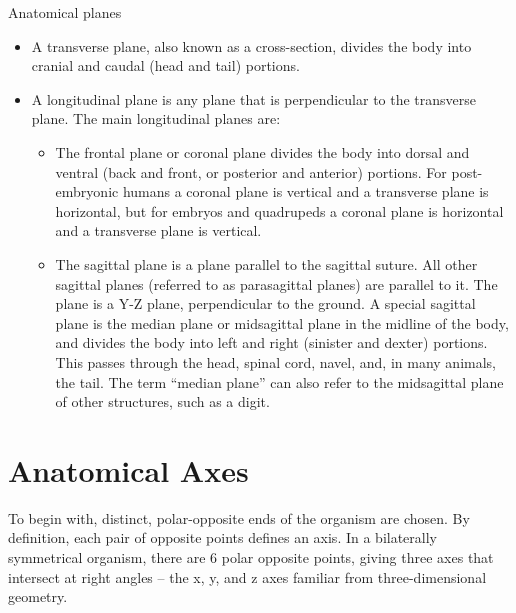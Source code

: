Anatomical planes

\begin{itemize}
\tightlist
\item
  A transverse plane, also known as a cross-section, divides the body into cranial and caudal (head and tail) portions.
\item
  A longitudinal plane is any plane that is perpendicular to the transverse plane. The main longitudinal planes are:

  \begin{itemize}
  \tightlist
  \item
    The frontal plane or coronal plane divides the body into dorsal and ventral (back and front, or posterior and anterior) portions. For post-embryonic humans a coronal plane is vertical and a transverse plane is horizontal, but for embryos and quadrupeds a coronal plane is horizontal and a transverse plane is vertical.
  \item
    The sagittal plane is a plane parallel to the sagittal suture. All other sagittal planes (referred to as parasagittal planes) are parallel to it. The plane is a Y-Z plane, perpendicular to the ground. A special sagittal plane is the median plane or midsagittal plane in the midline of the body, and divides the body into left and right (sinister and dexter) portions. This passes through the head, spinal cord, navel, and, in many animals, the tail. The term ``median plane'' can also refer to the midsagittal plane of other structures, such as a digit.
  \end{itemize}
\end{itemize}

\hypertarget{anatomical-axes}{%
\section{Anatomical Axes}\label{anatomical-axes}}

To begin with, distinct, polar-opposite ends of the organism are chosen. By definition, each pair of opposite points defines an axis. In a bilaterally symmetrical organism, there are 6 polar opposite points, giving three axes that intersect at right angles -- the x, y, and z axes familiar from three-dimensional geometry.

